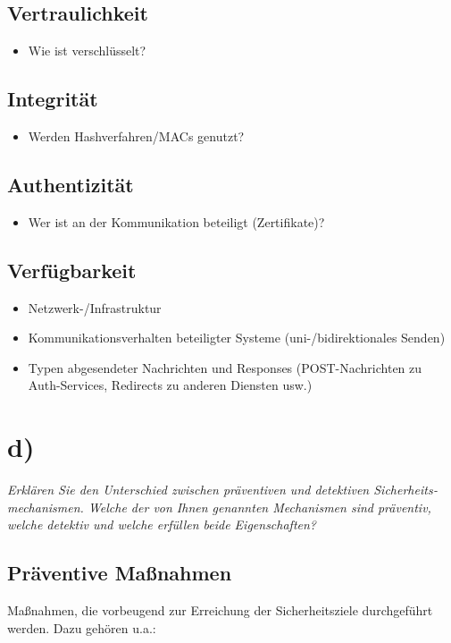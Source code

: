 \subsection*{Vertraulichkeit}
\begin{itemize}
    \itemsep0.5em
    \item Wie ist verschlüsselt?
\end{itemize}

\subsection*{Integrität}
\begin{itemize}
    \itemsep0.5em
    \item Werden Hashverfahren/MACs genutzt?
\end{itemize}

\subsection*{Authentizität}
\begin{itemize}
    \itemsep0.5em
    \item Wer ist an der Kommunikation beteiligt (Zertifikate)?
\end{itemize}

\subsection*{Verfügbarkeit}
\begin{itemize}
    \itemsep0.5em
    \item Netzwerk-/Infrastruktur
    \item Kommunikationsverhalten beteiligter Systeme (uni-/bidirektionales Senden)
    \item Typen abgesendeter Nachrichten und Responses (POST-Nachrichten zu Auth-Services, Redirects zu anderen Diensten usw.)
\end{itemize}

\section{d)}

\textit{Erklären Sie den Unterschied zwischen präventiven und detektiven Sicherheits‐
mechanismen. Welche der von Ihnen genannten Mechanismen sind präventiv, welche detektiv und welche erfüllen beide Eigenschaften?}\\

\subsection*{Präventive Maßnahmen}
Maßnahmen, die vorbeugend zur Erreichung der Sicherheitsziele durchgeführt werden. Dazu gehören u.a.:

